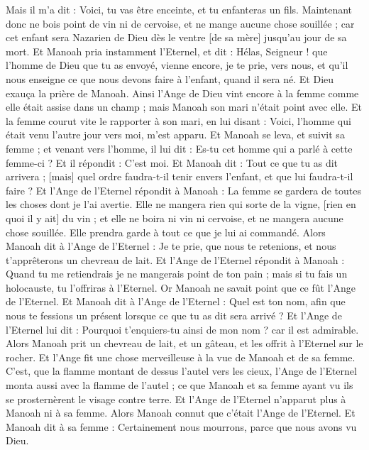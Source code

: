 \begin{multicols}{2}
Mais il m'a dit : Voici, tu vas être enceinte, et tu enfanteras un fils. Maintenant donc ne bois point de vin ni de cervoise, et ne mange aucune chose souillée ; car cet enfant sera Nazarien de Dieu dès le ventre [de sa mère] jusqu'au jour de sa mort.
Et Manoah pria instamment l'Eternel, et dit : Hélas, Seigneur ! que l'homme de Dieu que tu as envoyé, vienne encore, je te prie, vers nous, et qu'il nous enseigne ce que nous devons faire à l'enfant, quand il sera né.
Et Dieu exauça la prière de Manoah. Ainsi l'Ange de Dieu vint encore à la femme comme elle était assise dans un champ ; mais Manoah son mari n'était point avec elle.
Et la femme courut vite le rapporter à son mari, en lui disant : Voici, l'homme qui était venu l'autre jour vers moi, m'est apparu.
Et Manoah se leva, et suivit sa femme ; et venant vers l'homme, il lui dit : Es-tu cet homme qui a parlé à cette femme-ci ? Et il répondit : C'est moi.
Et Manoah dit : Tout ce que tu as dit arrivera ; [mais] quel ordre faudra-t-il tenir envers l'enfant, et que lui faudra-t-il faire ?
Et l'Ange de l'Eternel répondit à Manoah : La femme se gardera de toutes les choses dont je l'ai avertie.
Elle ne mangera rien qui sorte de la vigne, [rien en quoi il y ait] du vin ; et elle ne boira ni vin ni cervoise, et ne mangera aucune chose souillée. Elle prendra garde à tout ce que je lui ai commandé.
Alors Manoah dit à l'Ange de l'Eternel : Je te prie, que nous te retenions, et nous t'apprêterons un chevreau de lait.
Et l'Ange de l'Eternel répondit à Manoah : Quand tu me retiendrais je ne mangerais point de ton pain ; mais si tu fais un holocauste, tu l'offriras à l'Eternel. Or Manoah ne savait point que ce fût l'Ange de l'Eternel.
Et Manoah dit à l'Ange de l'Eternel : Quel est ton nom, afin que nous te fessions un présent lorsque ce que tu as dit sera arrivé ?
Et l'Ange de l'Eternel lui dit : Pourquoi t'enquiers-tu ainsi de mon nom ? car il est admirable.
Alors Manoah prit un chevreau de lait, et un gâteau, et les offrit à l'Eternel sur le rocher. Et l'Ange fit une chose merveilleuse à la vue de Manoah et de sa femme.
C'est, que la flamme montant de dessus l'autel vers les cieux, l'Ange de l'Eternel monta aussi avec la flamme de l'autel ; ce que Manoah et sa femme ayant vu ils se prosternèrent le visage contre terre.
Et l'Ange de l'Eternel n'apparut plus à Manoah ni à sa femme. Alors Manoah connut que c'était l'Ange de l'Eternel.
Et Manoah dit à sa femme : Certainement nous mourrons, parce que nous avons vu Dieu.

\end{multicols}
